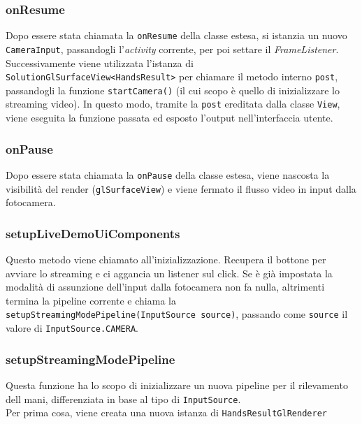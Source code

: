 \subsubsection{onResume}
Dopo essere stata chiamata la \texttt{onResume} della classe estesa, si istanzia un nuovo \texttt{CameraInput}, passandogli l'\textit{activity} corrente, per poi settare il \textit{FrameListener}.\\
Successivamente viene utilizzata l'istanza di \texttt{SolutionGlSurfaceView<HandsResult>} per chiamare il metodo interno \texttt{post}, passandogli la funzione \texttt{startCamera()} (il cui scopo è quello di inizializzare lo streaming video). In questo modo, tramite la \texttt{post} ereditata dalla classe \texttt{View}, viene eseguita la funzione passata ed esposto l'output nell'interfaccia utente.


\subsubsection{onPause}
Dopo essere stata chiamata la \texttt{onPause} della classe estesa, viene nascosta la visibilità del render (\texttt{glSurfaceView}) e viene fermato il flusso video in input dalla fotocamera.


\subsubsection{setupLiveDemoUiComponents}
Questo metodo viene chiamato all'inizializzazione. Recupera il bottone per avviare lo streaming e ci aggancia un listener sul click. Se è già impostata la modalità di assunzione dell'input dalla fotocamera non fa nulla, altrimenti termina la pipeline corrente e chiama la \texttt{setupStreamingModePipeline(InputSource source)}, passando come \texttt{source} il valore di \texttt{InputSource.CAMERA}.


\subsubsection{setupStreamingModePipeline}
Questa funzione ha lo scopo di inizializzare un nuova pipeline per il rilevamento dell mani, differenziata in base al tipo di \texttt{InputSource}.\\
Per prima cosa, viene creata una nuova istanza di \texttt{HandsResultGlRenderer}